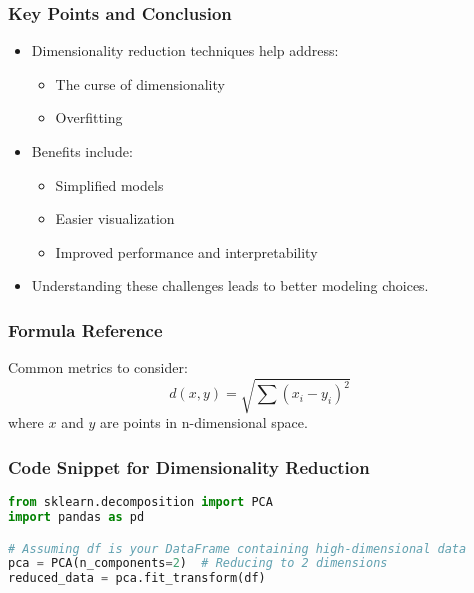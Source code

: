 \documentclass{beamer}
\begin{document}
\begin{frame}[fragile]
    \frametitle{Key Points and Conclusion}
    \begin{itemize}
        \item Dimensionality reduction techniques help address:
        \begin{itemize}
            \item The curse of dimensionality
            \item Overfitting
        \end{itemize}
        \item Benefits include:
        \begin{itemize}
            \item Simplified models
            \item Easier visualization
            \item Improved performance and interpretability
        \end{itemize}
        \item Understanding these challenges leads to better modeling choices.
    \end{itemize}
\end{frame}

\begin{frame}[fragile]
    \frametitle{Formula Reference}
    Common metrics to consider:
    \begin{equation}
        d(x, y) = \sqrt{\sum (x_i - y_i)^2}
    \end{equation}
    where \(x\) and \(y\) are points in n-dimensional space.
\end{frame}

\begin{frame}[fragile]
    \frametitle{Code Snippet for Dimensionality Reduction}
    \begin{lstlisting}[language=Python]
from sklearn.decomposition import PCA
import pandas as pd

# Assuming df is your DataFrame containing high-dimensional data
pca = PCA(n_components=2)  # Reducing to 2 dimensions
reduced_data = pca.fit_transform(df)
    \end{lstlisting}
\end{frame}
\end{document}
